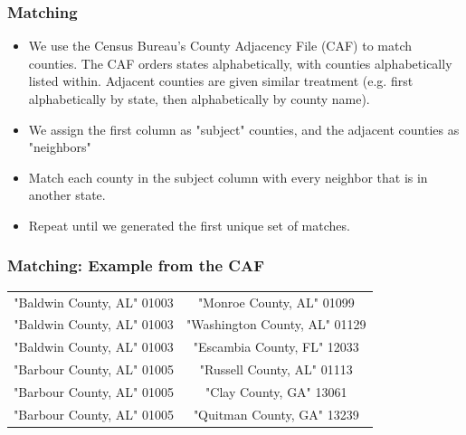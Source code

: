 \documentclass{beamer}
\begin{document}
\begin{frame}
\frametitle{Matching}

\begin{itemize}
\item We use the Census Bureau's County Adjacency File (CAF) to match counties. The CAF orders states alphabetically, with counties alphabetically listed within. Adjacent counties are given similar treatment (e.g. first alphabetically by state, then alphabetically by county name).
\item We assign the first column as "subject" counties, and the adjacent counties as "neighbors"
\item Match each county in the subject column with every neighbor that is in another state.
\item Repeat until we generated the first unique set of matches.
\end{itemize}
\end{frame}

\begin{frame}
\frametitle{Matching: Example from the CAF}
\begin{center}
\begin{tabular}{cc} 
 \hline
 "Baldwin County, AL"  01003 & "Monroe County, AL"  01099 \\ 
 "Baldwin County, AL"  01003 & "Washington County, AL"  01129  \\ 
 "Baldwin County, AL"  01003 & "Escambia County, FL"  12033  \\ 
 "Barbour County, AL"  01005 & "Russell County, AL"  01113\\
 "Barbour County, AL"  01005 & "Clay County, GA"  13061\\
 "Barbour County, AL"  01005 & "Quitman County, GA"  13239\\
 \hline
\end{tabular}
\end{center}
\end{frame}
\end{document}
